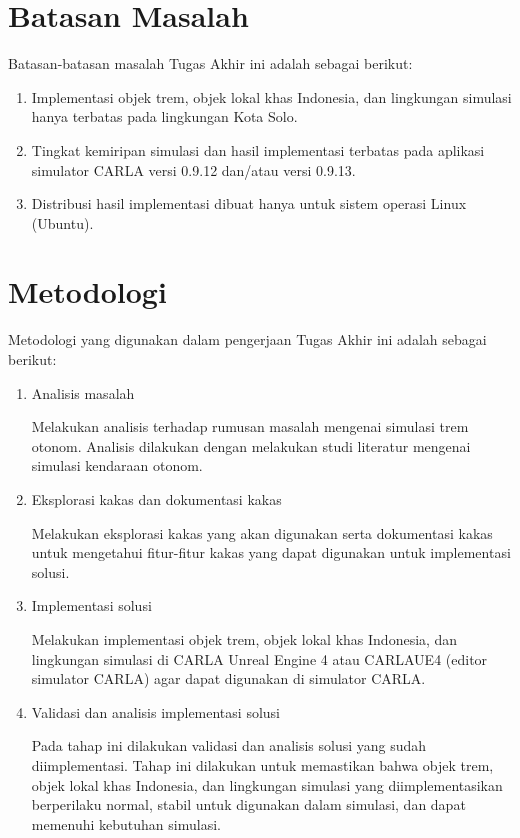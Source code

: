 \section{Batasan Masalah}

Batasan-batasan masalah Tugas Akhir ini adalah sebagai berikut:

\begin{enumerate}

    \item Implementasi objek trem, objek lokal khas Indonesia, dan lingkungan
    simulasi hanya terbatas pada lingkungan Kota Solo.

    \item Tingkat kemiripan simulasi dan hasil implementasi terbatas pada
    aplikasi simulator CARLA versi 0.9.12 dan/atau versi 0.9.13.

    \item Distribusi hasil implementasi dibuat hanya untuk sistem operasi Linux
    (Ubuntu).

\end{enumerate}

\section{Metodologi}

Metodologi yang digunakan dalam pengerjaan Tugas Akhir ini adalah sebagai
berikut:

\begin{enumerate}

    \item Analisis masalah

    Melakukan analisis terhadap rumusan masalah mengenai simulasi trem otonom.
    Analisis dilakukan dengan melakukan studi literatur mengenai simulasi
    kendaraan otonom.

    \item Eksplorasi kakas dan dokumentasi kakas

    Melakukan eksplorasi kakas yang akan digunakan serta dokumentasi kakas untuk
    mengetahui fitur-fitur kakas yang dapat digunakan untuk implementasi solusi.

    \item Implementasi solusi

    Melakukan implementasi objek trem, objek lokal khas Indonesia, dan
    lingkungan simulasi di CARLA Unreal Engine 4 atau CARLAUE4 (editor simulator
    CARLA) agar dapat digunakan di simulator CARLA.

    \item Validasi dan analisis implementasi solusi

    Pada tahap ini dilakukan validasi dan analisis solusi yang sudah
    diimplementasi. Tahap ini dilakukan untuk memastikan bahwa objek trem, objek
    lokal khas Indonesia, dan lingkungan simulasi yang diimplementasikan
    berperilaku normal, stabil untuk digunakan dalam simulasi, dan dapat
    memenuhi kebutuhan simulasi.

\end{enumerate}

